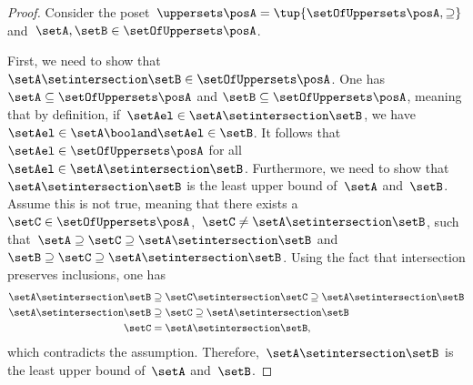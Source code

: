 \begin{proof}
    Consider the poset~$\uppersets \posA=\tup{\setOfUppersets \posA,\supseteq}$ and~$\setA,\setB\in \setOfUppersets \posA$.

    First, we need to show that~$\setA\setintersection \setB\in \setOfUppersets \posA$.
    One has~$\setA \subseteq \setOfUppersets \posA$ and $\setB\subseteq \setOfUppersets \posA$, meaning that by definition, if~$\setAel\in \setA\setintersection \setB$, we have~$\setAel \in \setA \booland \setAel \in \setB$.
    It follows that~$\setAel \in \setOfUppersets \posA$ for all~$\setAel \in \setA\setintersection \setB$.
    Furthermore, we need to show that~$\setA\setintersection \setB$ is the least upper bound of~$\setA$ and~$\setB$.
    Assume this is not true, meaning that there exists a~$\setC\in \setOfUppersets \posA$,~$\setC\neq \setA\setintersection \setB$, such that~$\setA\supseteq \setC\supseteq \setA\setintersection \setB$ and~$\setB\supseteq \setC\supseteq \setA\setintersection \setB$.
    Using the fact that intersection preserves inclusions, one has
    \begin{equation}
        \begin{aligned}
            \setA\setintersection \setB & \supseteq \setC\setintersection \setC \supseteq \setA\setintersection \setB \\
            \setA\setintersection \setB & \supseteq \setC \supseteq \setA\setintersection \setB                       \\
            \setC                       & = \setA\setintersection \setB,
        \end{aligned}
    \end{equation}
    which contradicts the assumption.
    Therefore,~$\setA\setintersection \setB$ is the least upper bound of~$\setA$ and~$\setB$.


\end{proof}

